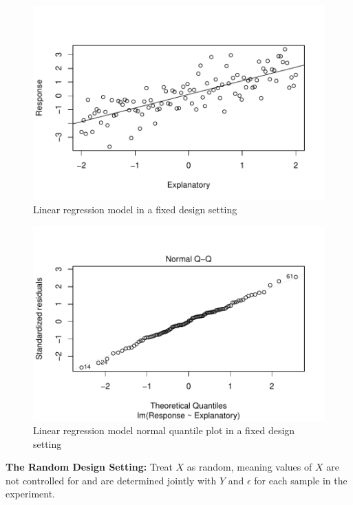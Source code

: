 \documentclass[nohyperref]{article}
\theoremstyle{plain}
\theoremstyle{definition}
\theoremstyle{remark}
\begin{document}
\begin{figure}[!h]
\vskip 0.2in
\begin{center}
\centerline{\includegraphics[width=\columnwidth]{fixedReg.pdf}}
\caption{Linear regression model in a fixed design setting}
\label{linRegFixed}
\end{center}
\vskip -0.2in
\end{figure}

\begin{figure}[!h]
\vskip 0.2in
\begin{center}
\centerline{\includegraphics[width=\columnwidth]{fixedQQ.pdf}}
\caption{Linear regression model normal quantile plot in a fixed design setting}
\label{linRegFixedQQ}
\end{center}
\vskip -0.2in
\end{figure}


\textbf{The Random Design Setting:} Treat $X$ as random, meaning values of $X$ are not controlled for and are determined jointly with $Y$ and $\epsilon$ for each sample in the experiment. 
\end{document}
